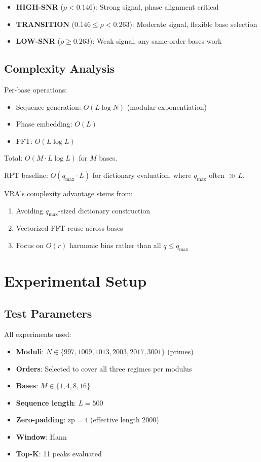 \documentclass[conference]{IEEEtran}
\begin{document}
\begin{itemize}
    \item \textbf{HIGH-SNR} ($\rho < 0.146$): Strong signal, phase alignment critical
    \item \textbf{TRANSITION} ($0.146 \leq \rho < 0.263$): Moderate signal, flexible base selection
    \item \textbf{LOW-SNR} ($\rho \geq 0.263$): Weak signal, any same-order bases work
\end{itemize}

\subsection{Complexity Analysis}

Per-base operations:
\begin{itemize}
    \item Sequence generation: $O(L \log N)$ (modular exponentiation)
    \item Phase embedding: $O(L)$
    \item FFT: $O(L \log L)$
\end{itemize}

Total: $O(M \cdot L \log L)$ for $M$ bases.

RPT baseline: $O(q_{\max} \cdot L)$ for dictionary evaluation, where $q_{\max}$ often $\gg L$.

VRA's complexity advantage stems from:
\begin{enumerate}
    \item Avoiding $q_{\max}$-sized dictionary construction
    \item Vectorized FFT reuse across bases
    \item Focus on $O(r)$ harmonic bins rather than all $q \leq q_{\max}$
\end{enumerate}


\section{Experimental Setup}

\subsection{Test Parameters}

All experiments used:
\begin{itemize}
    \item \textbf{Moduli}: $N \in \{997, 1009, 1013, 2003, 2017, 3001\}$ (primes)
    \item \textbf{Orders}: Selected to cover all three regimes per modulus
    \item \textbf{Bases}: $M \in \{1, 4, 8, 16\}$
    \item \textbf{Sequence length}: $L = 500$
    \item \textbf{Zero-padding}: $\text{zp} = 4$ (effective length 2000)
    \item \textbf{Window}: Hann
    \item \textbf{Top-K}: 11 peaks evaluated
\end{itemize}
\end{document}
